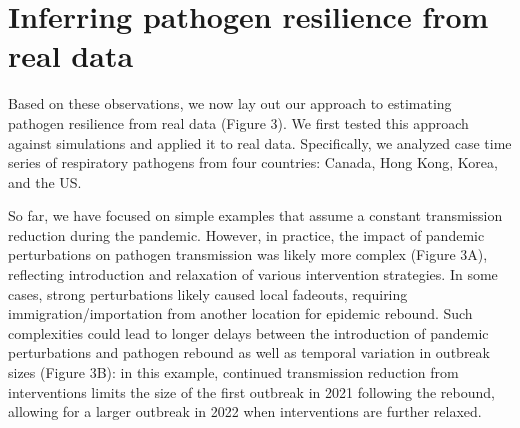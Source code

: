 \documentclass[12pt]{article}
\begin{document}
\section*{Inferring pathogen resilience from real data}

Based on these observations, we now lay out our approach to estimating pathogen resilience from real data (Figure 3).
We first tested this approach against simulations and applied it to real data.
Specifically, we analyzed case time series of respiratory pathogens from four countries: Canada, Hong Kong, Korea, and the US.

So far, we have focused on simple examples that assume a constant transmission reduction during the pandemic.
However, in practice, the impact of pandemic perturbations on pathogen transmission was likely more complex (Figure 3A), reflecting introduction and relaxation of various intervention strategies.
In some cases, strong perturbations likely caused local fadeouts, requiring immigration/importation from another location for epidemic rebound.
Such complexities could lead to longer delays between the introduction of pandemic perturbations and pathogen rebound as well as temporal variation in outbreak sizes (Figure 3B):
in this example, continued transmission reduction from interventions limits the size of the first outbreak in 2021 following the rebound, allowing for a larger outbreak in 2022 when interventions are further relaxed.
\end{document}
